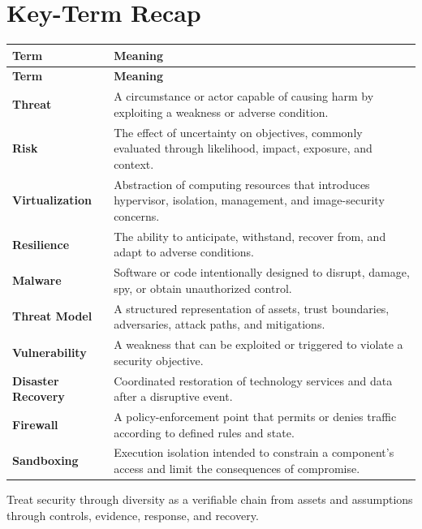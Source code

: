 \documentclass[11pt]{article}
\begin{document}
\section*{Key-Term Recap}
\begin{longtable}{>{\RaggedRight\arraybackslash}p{}>{\RaggedRight\arraybackslash}p{}}
\toprule\rowcolor{Navy}\color{white}\textbf{Term} & \color{white}\textbf{Meaning}\\\midrule
\endfirsthead
\toprule\rowcolor{Navy}\color{white}\textbf{Term} & \color{white}\textbf{Meaning}\\\midrule
\endhead
\textbf{Threat} & A circumstance or actor capable of causing harm by exploiting a weakness or adverse condition. \\\midrule
\textbf{Risk} & The effect of uncertainty on objectives, commonly evaluated through likelihood, impact, exposure, and context. \\\midrule
\textbf{Virtualization} & Abstraction of computing resources that introduces hypervisor, isolation, management, and image-security concerns. \\\midrule
\textbf{Resilience} & The ability to anticipate, withstand, recover from, and adapt to adverse conditions. \\\midrule
\textbf{Malware} & Software or code intentionally designed to disrupt, damage, spy, or obtain unauthorized control. \\\midrule
\textbf{Threat Model} & A structured representation of assets, trust boundaries, adversaries, attack paths, and mitigations. \\\midrule
\textbf{Vulnerability} & A weakness that can be exploited or triggered to violate a security objective. \\\midrule
\textbf{Disaster Recovery} & Coordinated restoration of technology services and data after a disruptive event. \\\midrule
\textbf{Firewall} & A policy-enforcement point that permits or denies traffic according to defined rules and state. \\\midrule
\textbf{Sandboxing} & Execution isolation intended to constrain a component's access and limit the consequences of compromise. \\\midrule
\bottomrule
\end{longtable}
\begin{takeawaybox}
Treat security through diversity as a verifiable chain from assets and assumptions through controls, evidence, response, and recovery.
\end{takeawaybox}
\end{document}
